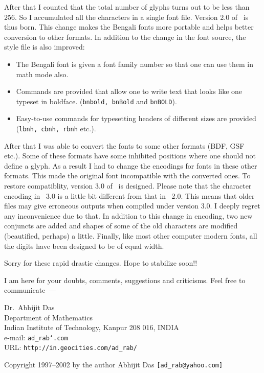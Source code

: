 After that I counted that the total number of glyphs turns out to be
less than 256. So I accumulated all the characters in a single font
file. Version 2.0 of \bwti\ is thus born. This change makes the Bengali
fonts more portable and helps better conversion to other formats.
In addition to the change in the font source, the style file is also
improved:
\begin{itemize}
\item The Bengali font is given a font family number so that one can
use them in math mode also. 
\item Commands are provided that allow one to write text that looks like
one typeset in boldface. ({\tt\bs bnbold, \bs bnBold} and {\tt\bs bnBOLD}).
\item Easy-to-use commands for typesetting headers of different sizes are
provided ({\tt\bs lbnh, \bs cbnh, \bs rbnh} etc.).
\end{itemize}

After that I was able to convert the fonts to some other formats (BDF,
GSF etc.). Some of these formats have some inhibited positions where one
should not define a glyph. As a result I had to change the encodings for
fonts in these other formats. This made the original font incompatible with
the converted ones. To restore compatiblity, version 3.0 of \bwti\ is
designed. Please note that the character encoding in \bwti\ 3.0 is a little
bit different from that in \bwti\ 2.0. This means that older files may
give erroneous outputs when compiled under version 3.0. I deeply regret
any inconvenience due to that. In addition to this change in encoding,
two new conjuncts are added and shapes of some of the old characters are
modified (beautified, perhaps) a little. Finally, like most other computer
modern fonts, all the digits have been designed to be of equal width.

Sorry for these rapid drastic changes. Hope to stabilize soon!!

I am here for your doubts, comments, suggestions and
criticisms. Feel free to communicate~---

\noindent
Dr.~Abhijit Das\\
Department of Mathematics\\
Indian Institute of Technology, Kanpur 208 016, INDIA\\
e-mail: {\tt ad\_rab\char`\@yahoo.com}\\
URL: {\tt http://in.geocities.com/ad\_rab/}

Copyright 1997--2002 by the author Abhijit Das {\tt[ad\_rab@yahoo.com]}

